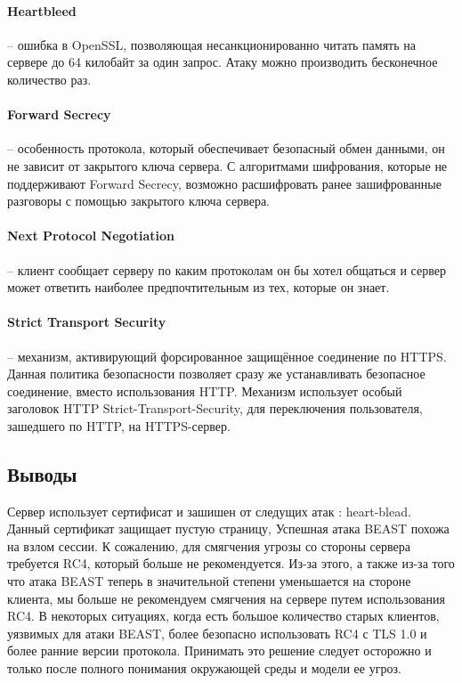 \documentclass[10pt,a4paper]{article}
\begin{document}
\paragraph{Heartbleed} -- ошибка в OpenSSL, позволяющая несанкционированно читать память на сервере до 64 килобайт за один запрос. Атаку можно производить бесконечное количество раз.

\paragraph{Forward Secrecy} -- особенность протокола, который обеспечивает безопасный обмен данными, он не зависит от закрытого ключа сервера. С алгоритмами шифрования, которые не поддерживают Forward Secrecy, возможно расшифровать ранее зашифрованные разговоры с помощью закрытого ключа сервера.

\paragraph{Next Protocol Negotiation} -- клиент сообщает серверу по каким протоколам он бы хотел общаться и сервер может ответить наиболее предпочтительным из тех, которые он знает.

\paragraph{Strict Transport Security} -- механизм, активирующий форсированное защищённое соединение по HTTPS. Данная политика безопасности позволяет сразу же устанавливать безопасное соединение, вместо использования HTTP. Механизм использует особый заголовок HTTP Strict-Transport-Security, для переключения пользователя, зашедшего по HTTP, на HTTPS-сервер.


\subsection{Выводы}

Сервер использует сертифисат и зашишен от следущих атак : heart-blead. Данный сертификат защищает пустую страницу, 
Успешная атака BEAST похожа на взлом сессии. К сожалению, для смягчения угрозы со стороны сервера требуется RC4, который больше не рекомендуется. Из-за этого, а также из-за того что атака BEAST теперь в значительной степени уменьшается на стороне клиента, мы больше не рекомендуем смягчения на сервере путем использования RC4. В некоторых ситуациях, когда есть большое количество старых клиентов, уязвимых для атаки BEAST, более безопасно использовать RC4 с TLS 1.0 и более ранние версии протокола. Принимать это решение следует осторожно и только после полного понимания окружающей среды и модели ее угроз.
\end{document}
